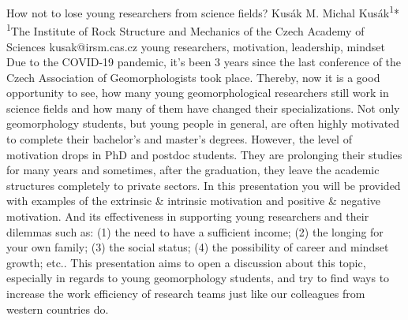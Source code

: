 
\abstract
{How not to lose young researchers from science fields?} 
{Kusák M.} 
{Michal Kusák\textsuperscript{1}*} 
{\TLtag} 
{
	\textsuperscript{1}The Institute of Rock Structure and Mechanics of the Czech Academy of Sciences
}
{kusak@irsm.cas.cz}  %
{young researchers, motivation, leadership, mindset}
{Due to the COVID-19 pandemic, it’s been 3 years since the last conference of the Czech Association of Geomorphologists took place. Thereby, now it is a good opportunity to see, how many young geomorphological researchers still work in science fields and how many of them have changed their specializations. Not only geomorphology students, but young people in general, are often highly motivated to complete their bachelor's and master's degrees. However, the level of motivation drops in PhD and postdoc students. They are prolonging their studies for many years and sometimes, after the graduation, they leave the academic structures completely to private sectors. In this presentation you will be provided with examples of the extrinsic \& intrinsic motivation and positive \& negative motivation. And its effectiveness in supporting young researchers and their dilemmas such as: (1) the need to have a sufficient income; (2) the longing for your own family; (3) the social status; (4) the possibility of career and mindset growth; etc.. This presentation aims to open a discussion about this topic, especially in regards to young geomorphology students, and try to find ways to increase the work efficiency of research teams just like our colleagues from western countries do.
}
{
}

















